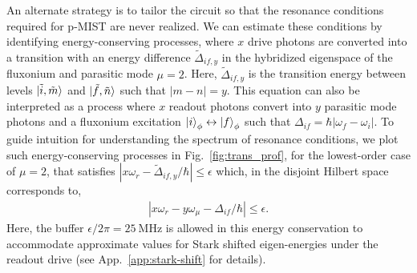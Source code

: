 \documentclass[%
reprint,
superscriptaddress,
 amsmath,amssymb,
 aps,
 prx,
longbibliography,
floatfix,
]{revtex4-2}
\begin{document}
An alternate strategy is to tailor the circuit so that the resonance conditions required for p-MIST are never realized. We can estimate these conditions by identifying energy-conserving processes, where $x$ drive photons are converted into a transition with an energy difference $\tilde{\Delta}_{if,y}$ in the hybridized eigenspace of the fluxonium and parasitic mode $\mu=2$. Here, $\tilde{\Delta}_{if,y}$ is the transition energy between levels $\ket{\tilde{i},\tilde{m}}$ and $\ket{\tilde{f},\tilde{n}}$ such that $|m-n|=y$. 
This equation can also be interpreted as a process where $x$ readout photons convert into $y$ parasitic mode photons and a fluxonium excitation $\ket{i}_\phi \leftrightarrow \ket{f}_\phi$ such that $\Delta_{if}=\hbar|\omega_f-\omega_i|$. To guide intuition for understanding the spectrum of resonance conditions, we plot such energy-conserving processes in Fig.~\ref{fig:trans_prof}, for the lowest-order case of $\mu=2$, that satisfies $|x\omega_r-\tilde{\Delta}_{if,y}/\hbar|\le \epsilon$ which, in the disjoint Hilbert space corresponds to,
\begin{align}
|x\omega_r-y\omega_\mu-\Delta_{if}/\hbar|\le \epsilon.
\label{eq:En_cons}
\end{align}
Here, the buffer $\epsilon/2\pi= 25 \ \mathrm{MHz}$ is allowed in this energy conservation to accommodate approximate values for Stark shifted eigen-energies under the readout drive (see App.~\ref{app:stark-shift} for details).
\end{document}
